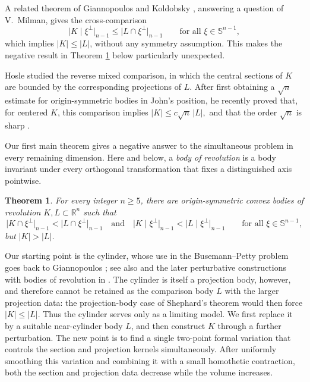 \documentclass[11pt]{article}
\newtheorem{theorem}{Theorem}[section]
\theoremstyle{remark}
\newcommand{\R}{\mathbb{R}}
\newcommand{\Sph}{\mathbb{S}}
\begin{document}
A related theorem of Giannopoulos and Koldobsky
\cite{GiannopoulosKoldobsky}, answering a question of V.~Milman, gives the
cross-comparison
\begin{equation}\label{eq:Milman-intro}
 \bigl|K\mid\xi^\perp\bigr|_{n-1}
 \leq
 \bigl|L\cap\xi^\perp\bigr|_{n-1}
 \qquad\text{for all }\xi\in\Sph^{n-1},
\end{equation}
which implies $|K|\leq|L|$, without any symmetry assumption. This makes
the negative result in Theorem \ref{thm:simultaneous} below particularly unexpected.

Hosle studied the reverse mixed comparison, in which the central sections
of $K$ are bounded by the corresponding projections of $L$.  After first
obtaining a $\sqrt n$ estimate for origin-symmetric bodies in John's
position, he recently proved that, for centered $K$, this comparison
implies
$
 |K|\leq c\sqrt n\,|L|,
$
and that the order $\sqrt n$ is sharp
\cite{Hosle,HosleIsomorphic}. 

Our first main theorem gives a negative answer to the simultaneous problem
in every remaining dimension.  Here and below, a \emph{body of revolution}
is a body invariant under every orthogonal transformation that fixes a
distinguished axis pointwise.

\begin{theorem}\label{thm:simultaneous}
For every integer $n\geq5$, there are origin-symmetric convex bodies of
revolution $K,L\subset\R^n$ such that
\[
 \bigl|K\cap\xi^\perp\bigr|_{n-1}
 <\bigl|L\cap\xi^\perp\bigr|_{n-1}
 \quad\text{and}\quad
 \bigl|K\mid\xi^\perp\bigr|_{n-1}
 <\bigl|L\mid\xi^\perp\bigr|_{n-1}
 \qquad\text{for all }\xi\in\Sph^{n-1},
\]
but $|K|>|L|$.
\end{theorem}

Our starting point is the cylinder, whose use in the Busemann--Petty
problem goes back to Giannopoulos \cite{Giannopoulos1990}; see also
\cite{Gardner1994,Papadimitrakis,GrinbergRivin} and the later perturbative
constructions with bodies of revolution in
\cite{GardnerRyaboginYaskinZvavitch,Ryabogin,
NazarovRyaboginZvavitchMaximal,
NazarovRyaboginZvavitchNonuniqueness}.  The cylinder is itself a
projection body, however, and therefore cannot be retained as the
comparison body $L$ with the larger projection data: the projection-body
case of Shephard's theorem would then force $|K|\leq |L|$.  Thus the
cylinder serves only as a limiting model.  We first replace it by a
suitable near-cylinder body $L$, and then construct $K$ through a further
perturbation.  The new point is to find a single two-point formal variation
that controls the section and projection kernels simultaneously.  After
uniformly smoothing this variation and combining it with a small
homothetic contraction, both the section and projection data decrease
while the volume increases.
\end{document}
